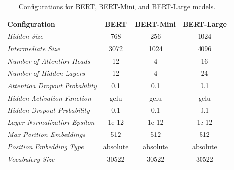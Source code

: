 \begin{table}
%
\centering
\begin{tabular}{l|c|c|c}
\toprule
\textbf{Configuration}                    & \textbf{BERT} & \textbf{BERT-Mini} & \textbf{BERT-Large} \\
\midrule
%
\textit{Hidden Size}                      & 768           & 256                & 1024               \\
\textit{Intermediate Size}                & 3072          & 1024               & 4096               \\
\textit{Number of Attention Heads}        & 12            & 4                  & 16                 \\
\textit{Number of Hidden Layers}          & 12            & 4                  & 24                 \\
\textit{Attention Dropout Probability}    & 0.1           & 0.1                & 0.1                \\
\textit{Hidden Activation Function}       & gelu          & gelu               & gelu               \\
\textit{Hidden Dropout Probability}       & 0.1           & 0.1                & 0.1                \\
\textit{Layer Normalization Epsilon}      & 1e-12         & 1e-12              & 1e-12              \\
\textit{Max Position Embeddings}          & 512           & 512                & 512                \\
\textit{Position Embedding Type}          & absolute      & absolute           & absolute           \\
\textit{Vocabulary Size}                  & 30522         & 30522              & 30522              \\
%
\bottomrule
\end{tabular}
\caption{Configurations for BERT, BERT-Mini, and BERT-Large models.}
%
\label{tab:bert_configs}
\end{table}